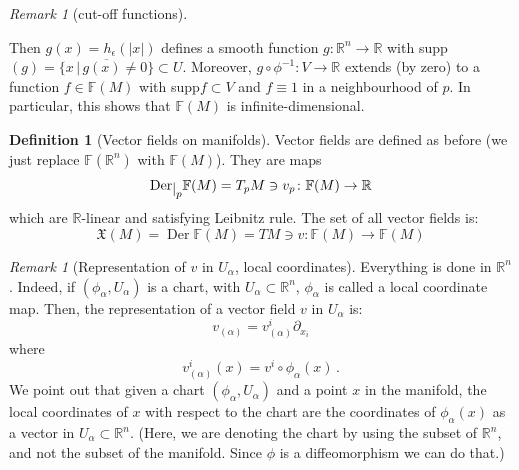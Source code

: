 \documentclass[a4paper,11pt,titlepage, article, oneside]{memoir}
\numberwithin{equation}{section}
\theoremstyle{definition}
\newtheorem{definition}[theorem]{Definition}
\theoremstyle{remark}
\newtheorem{remark}[theorem]{Remark}
\DeclareMathOperator{\Der}{Der}
\newcommand{\rfield}{\mathbb{R}}
\newcommand{\restrict}[2]{{#1}\raisebox{-.5ex}{$|$}_{#2}}
\begin{document}
\begin{remarkbox}
\begin{remark}[cut-off functions]
\begin{figure}[H]
\end{figure}
  Then $g(x) = h_{\epsilon}(|x|)$ defines a smooth function $g \colon \rfield^n \rightarrow \rfield$ with supp$(g) = \overline{\{ x \, | \, g(x) \not =  0\}} \subset U$. Moreover, $g \circ \phi^{-1} \colon V \rightarrow \rfield$ extends (by zero) to a function $f \in \mathbb{F}(M)$ with supp$f \subset V$ and $f \equiv 1$ in a neighbourhood of $p$. In particular, this shows that $\mathbb{F}(M)$ is infinite-dimensional.


\end{remark}\end{remarkbox}

\begin{definition}[Vector fields on manifolds]
  Vector fields are defined as before (we just replace $\mathbb{F}(\rfield^n)$ with $\mathbb{F}(M)$). They are maps
  $$\restrict{\Der}{p} \mathbb{F}(M) = T_p M \ni v_p \colon \mathbb{F}(M) \rightarrow \rfield$$
  which are $\rfield$-linear and satisfying Leibnitz rule.
  The set of all vector fields is:
  $$\mathfrak{X}(M) = \Der \mathbb{F}(M) = TM \ni v \colon \mathbb{F}(M) \rightarrow \mathbb{F}(M)$$

\end{definition}

\begin{remarkbox}\begin{remark}[Representation of $v$ in $U_{\alpha}$, local coordinates]
  Everything is done in $\rfield^n$. Indeed, if $(\phi_{\alpha}, U_{\alpha})$ is a chart, with $U_{\alpha} \subset \rfield^n$, $\phi_{\alpha}$ is called a local coordinate map. Then, the representation of a vector field $v$ in $U_{\alpha}$ is:
  $$v_{(\alpha)} = v_{(\alpha)}^i \partial_{x_i}$$
  where
  $$v_{(\alpha)}^i(x) = v^i \circ \phi_{\alpha}(x) \, .$$
  We point out that given a chart $(\phi_{\alpha}, U_{\alpha})$ and a point $x$ in the manifold, the local coordinates of $x$ with respect to the chart are the coordinates of $\phi_{\alpha}(x)$ as a vector in $U_{\alpha} \subset \rfield^n$. (Here, we are denoting the chart by using the subset of $	\rfield^n$, and not the subset of the manifold. Since $\phi$ is a diffeomorphism we can do that.)
\end{remark}\end{remarkbox}
\end{document}
